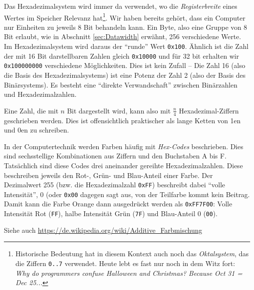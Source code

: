 Das Hexadezimalsystem wird immer da verwendet, wo die \emph{Registerbreite} eines Wertes im Speicher Relevanz hat\footnote{Historische Bedeutung hat in diesem Kontext auch noch das \emph{Oktalsystem}, das die Ziffern \texttt{0..7} verwendet. Heute lebt es fast nur noch in dem Witz fort: \emph{Why do programmers confuse Halloween and Christmas? Because Oct 31 = Dec 25...}}. Wir haben bereits gehört, dass ein Computer nur Einheiten zu jeweils 8 Bit behandeln kann. Ein Byte, also eine Gruppe von 8 Bit erlaubt, wie in Abschnitt \ref{sec:Datawidth} erwähnt, 256 verschiedene Werte. Im Hexadezimalsystem wird daraus der \enquote{runde} Wert \texttt{0x100}. Ähnlich ist die Zahl der mit 16 Bit darstellbaren Zahlen gleich \texttt{0x10000} und für 32 bit erhalten wir \texttt{0x100000000} verschiedene Möglichkeiten. Dies ist kein Zufall -- Die Zahl 16 (also die Basis des Hexadezimalsystems) ist eine Potenz der Zahl 2 (also der Basis des Binärsystems). Es besteht eine \enquote{direkte Verwandschaft} zwischen Binärzahlen und Hexadezimalzahlen.

Eine Zahl, die mit $n$ Bit dargestellt wird, kann also mit $\frac{n}{4}$ Hexadezimal-Ziffern geschrieben werden. Dies ist offensichtlich praktischer als lange Ketten von 1en und 0en zu schreiben.

\begin{hintbox}
In der Computertechnik werden Farben häufig mit \emph{Hex-Codes} beschrieben. Dies sind sechsstellige Kombinationen aus Ziffern und den Buchstaben A bis F. Tatsächlich sind diese Codes drei aneinander gereihte Hexadezimalzahlen. Diese beschreiben jeweils den Rot-, Grün- und Blau-Anteil einer Farbe. Der Dezimalwert 255 (bzw. die Hexadezimalzahl \texttt{0xFF}) beschreibt dabei \enquote{volle Intensität}, 0 (oder \texttt{0x00} dagegen sagt aus, von der Teilfarbe kommt kein Beitrag. Damit kann die Farbe Orange dann ausgedrückt werden als \texttt{0xFF7F00}: Volle Intensität Rot (\texttt{FF}), halbe Intensität Grün (\texttt{7F}) und Blau-Anteil 0 (\texttt{00}).

Siehe auch \url{https://de.wikipedia.org/wiki/Additive_Farbmischung}
\end{hintbox}

